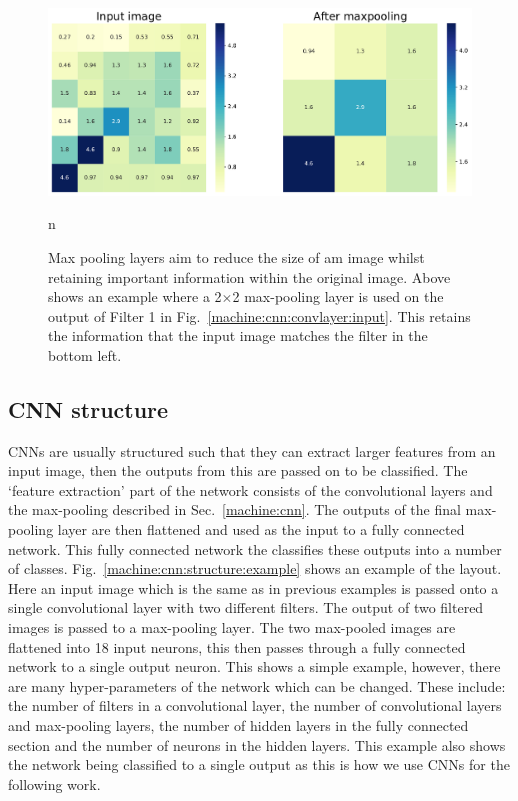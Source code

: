 \begin{figure}[h]
    \centering
    \includegraphics[width=\columnwidth]{C4_cnn/maxpool.pdf}
    \caption{Max pooling layers aim to reduce the size of am image whilst retaining important information within the original image. Above shows an example where a 2$\times$2 max-pooling layer is used on the output of Filter 1 in Fig.~\ref{machine:cnn:convlayer:input}. This retains the information that the input image matches the filter in the bottom left.}n
    \label{machine:cnn:maxpool:image}
\end{figure}

\subsection{CNN structure}

\acp{CNN} are usually structured such that they can extract larger features from an input image, then the outputs from this are passed on to be classified.
The `feature extraction' part of the network consists of the convolutional layers and the max-pooling described in Sec.~\ref{machine:cnn}.
The outputs of the final max-pooling layer are then flattened and used as the input to a fully connected network.
This fully connected network the classifies these outputs into a number of classes.
Fig.~\ref{machine:cnn:structure:example} shows an example of the layout. 
Here an input image which is the same as in previous examples is passed onto a single convolutional layer with two different filters.
The output of two filtered images is passed to a max-pooling layer.
The two max-pooled images are flattened into 18 input neurons, this then passes through a fully connected network to a single output neuron.
This shows a simple example, however, there are many hyper-parameters of the network which can be changed.
These include: the number of filters in a convolutional layer, the number of convolutional layers and max-pooling layers, the number of hidden layers in the fully connected section and the number of neurons in the hidden layers. 
This example also shows the network being classified to a single output as this is how we use \acp{CNN} for the following work.

